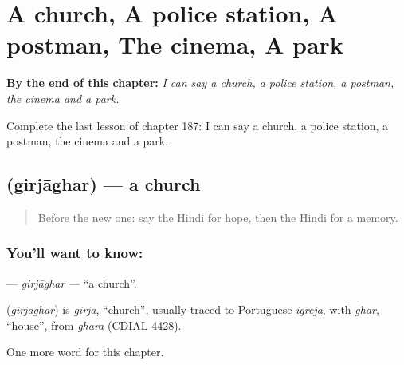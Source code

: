 
\chapter{A church, A police station, A postman, The cinema, A park}
\label{ch:hi-a-church-a-police-station-a-postman-the-cinema-a-park}

\begin{chapteropening}
\textbf{By the end of this chapter:} \emph{I can say a church, a police station, a postman, the cinema and a park.}

Complete the last lesson of chapter 187: I can say a church, a police station, a postman, the cinema and a park.
\end{chapteropening}

\section[\texorpdfstring{\hi{गिरजाघर} (girjāghar)}{गिरजाघर (girjāghar)}]{ (girjāghar) — a church}

\label{lesson:HI-C187-girjaghar}



\begin{quote}
Before the new one: say the Hindi for hope, then the Hindi for a memory.
\end{quote}

\subsection*{You'll want to know: }
\textbf{} — \emph{girjāghar} — \textquotedblleft{}a church\textquotedblright{}.

\begin{cousinweb}
\textbf{} (\emph{girjāghar}) is \emph{girjā}, \textquotedblleft{}church\textquotedblright{}, usually traced to Portuguese \emph{igreja}, with \emph{ghar}, \textquotedblleft{}house\textquotedblright{}, from \emph{ghara} (CDIAL 4428).
\end{cousinweb}

\begin{grammarlens}[title={What you've built}]
One more word for this chapter.
\end{grammarlens}

